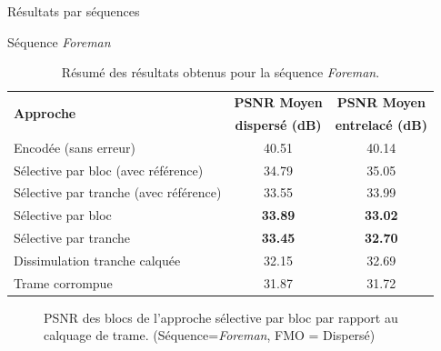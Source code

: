 \begin{section}{Résultats par séquences}
\begin{subsection}{Séquence \textit{Foreman}}
\begin{table}
\caption[Résumé des résultats obtenus pour la séquence
\textit{Foreman}]{Résumé des résultats obtenus pour la séquence
\textit{Foreman}.}
\centering
\begin{tabular}{| l | c | c |}
 \hline
 \multirow{2}{*}{\textbf{Approche}} & \textbf{PSNR Moyen}& \textbf{PSNR Moyen}\\
 &\textbf{dispersé (dB)}&\textbf{entrelacé (dB)}\\
 \hline
Encodée (sans erreur) & 40.51 & 40.14\\
Sélective par bloc (avec référence) & 34.79 & 35.05\\
Sélective par tranche (avec référence) & 33.55 & 33.99\\
Sélective par bloc & \textbf{33.89} & \textbf{33.02}\\
Sélective par tranche & \textbf{33.45} & \textbf{32.70}\\
Dissimulation tranche calquée & 32.15 & 32.69\\
Trame corrompue & 31.87 & 31.72\\
\hline
\end{tabular}
\end{table}

\begin{figure}  \caption[]{PSNR des blocs de l'approche sélective par bloc par rapport au
calquage de trame. (Séquence=\textit{Foreman}, FMO = Dispersé)}
\label{fig-ParSequenceDispersed8}
\end{figure}


\end{subsection}
\end{section}
